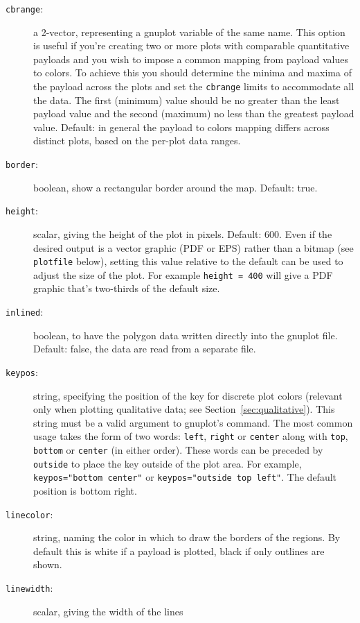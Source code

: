 \documentclass{article}
\begin{document}
\begin{description}
\item[\texttt{cbrange}:] a 2-vector, representing a \textsf{gnuplot}
  variable of the same name. This option is useful if you're creating
  two or more plots with comparable quantitative payloads and you wish
  to impose a common mapping from payload values to colors. To achieve
  this you should determine the minima and maxima of the payload
  across the plots and set the \texttt{cbrange} limits to accommodate
  all the data. The first (minimum) value should be no greater than
  the least payload value and the second (maximum) no less than the
  greatest payload value. Default: in general the payload to colors
  mapping differs across distinct plots, based on the per-plot data
  ranges.
\item[\texttt{border}:] boolean, show a rectangular border around the
  map. Default: true.
\item[\texttt{height}:] scalar, giving the height of the plot in
  pixels. Default: 600. Even if the desired output is a vector graphic
  (PDF or EPS) rather than a bitmap (see \texttt{plotfile} below),
  setting this value relative to the default can be used to adjust the
  size of the plot. For example \texttt{height = 400} will give a PDF
  graphic that's two-thirds of the default size.
\item[\texttt{inlined}:] boolean, to have the polygon data written
  directly into the \textsf{gnuplot} file. Default: false, the data
  are read from a separate file.
\item[\texttt{keypos}:] string, specifying the position of the key for
  discrete plot colors (relevant only when plotting qualitative data;
  see Section~\ref{sec:qualitative}).  This string must be a valid
  argument to gnuplot's  command.  The most common usage
  takes the form of two words: \texttt{left}, \texttt{right} or
  \texttt{center} along with \texttt{top}, \texttt{bottom} or
  \texttt{center} (in either order). These words can be preceded by
  \texttt{outside} to place the key outside of the plot area. For
  example, \verb|keypos="bottom center"| or
  \verb|keypos="outside top left"|.  The default position is bottom
  right.
\item[\texttt{linecolor}:] string, naming the color in which to draw
  the borders of the regions. By default this is white if a payload is
  plotted, black if only outlines are shown.
\item[\texttt{linewidth}:] scalar, giving the width of the lines

\end{description}
\end{document}
